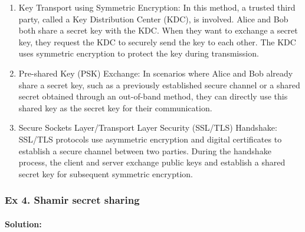 {\begin{enumerate}
	This protocol prevents replay attacks because the client cannot simply replay a previously captured response. Additionally, it mitigates reflection attacks because the server includes a challenge that is unique for each authentication attempt.

	\item 	    Key Transport using Symmetric Encryption: In this method, a trusted third party, called a Key Distribution Center (KDC), is involved. Alice and Bob both share a secret key with the KDC. When they want to exchange a secret key, they request the KDC to securely send the key to each other. The KDC uses symmetric encryption to protect the key during transmission.

	\item 	    Pre-shared Key (PSK) Exchange: In scenarios where Alice and Bob already share a secret key, such as a previously established secure channel or a shared secret obtained through an out-of-band method, they can directly use this shared key as the secret key for their communication.

	\item 	    Secure Sockets Layer/Transport Layer Security (SSL/TLS) Handshake: SSL/TLS protocols use asymmetric encryption and digital certificates to establish a secure channel between two parties. During the handshake process, the client and server exchange public keys and establish a shared secret key for subsequent symmetric encryption.
	\end{enumerate}}
	
	\subsubsection{Ex 4. Shamir secret sharing}
	
	\paragraph{Solution:}
	
